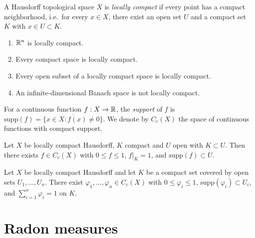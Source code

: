 \begin{definition}
A Hausdorff topological space $X$ is \emph{locally compact}
if every point has a compact neighborhood, i.e.\ for every $x \in X$, there exist
an open set $U$ and a compact set $K$ with $x \in U \subset K$.
\end{definition}

\begin{example}
\begin{enumerate}
    \item $\mathbb{R}^n$ is locally compact.
    \item Every compact space is locally compact.
    \item Every open subset of a locally compact space is locally compact.
    \item An infinite-dimensional Banach space is not locally compact.
\end{enumerate}
\end{example}

\begin{definition}
For a continuous function $f : X \to \mathbb{R}$, the \emph{support} of $f$ is
$\mathrm{supp}(f) = \overline{\{x \in X : f(x) \neq 0\}}$. We denote by
$C_c(X)$ the space of continuous functions with compact support.
\end{definition}

\begin{lemma}
\label{lem:urysohn}
Let $X$ be locally compact Hausdorff, $K$ compact and $U$ open with
$K \subset U$. Then there exists $f \in C_c(X)$ with $0 \leq f \leq 1$,
$f|_K = 1$, and $\mathrm{supp}(f) \subset U$.
\end{lemma}

\begin{proposition}
\label{prop:partition_unity}
Let $X$ be locally compact Hausdorff and let $K$ be a compact set covered by open
sets $U_1, \ldots, U_n$. There exist $\varphi_1, \ldots, \varphi_n \in C_c(X)$ with
$0 \leq \varphi_i \leq 1$, $\mathrm{supp}(\varphi_i) \subset U_i$, and
$\sum_{i=1}^n \varphi_i = 1$ on $K$.
\end{proposition}

\section{Radon measures}

